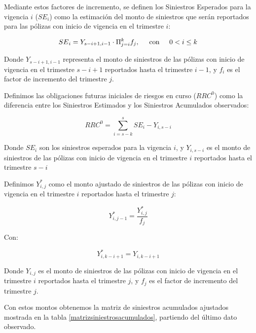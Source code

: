 \documentclass[11pt,twoside,openright,spanish]{report}
\numberwithin{equation}{chapter}
\numberwithin{figure}{chapter}
\numberwithin{table}{chapter}
\begin{document}
	Mediante estos factores de incremento, se definen los Siniestros Esperados para la vigencia $i$ (${SE}_{i}$) como la estimación del monto de siniestros que serán reportados para las pólizas con inicio de vigencia en el trimestre $i$:
	
	\begin{equation}
	{SE}_{i}={Y}_{s-i+1,i-1}\cdot\Pi_{j=i}^{k}{f}_{j},\hspace{0.5cm}\text{con}\hspace{0.5cm}0< i\le k
		\label{eq3}
	\end{equation}

	Donde ${Y}_{s-i+1,i-1}$ representa el monto de siniestros de las pólizas con inicio de vigencia en el trimestre $s-i+1$ reportados hasta el trimestre $i-1$, y ${f}_{i}$ es el factor de incremento del trimestre $j$. 

	Definimos las obligaciones futuras iniciales de riesgos en curso (${RRC}^{0}$) como la diferencia entre los Siniestros Estimados y los Siniestros Acumulados observados:
	
	\begin{equation}
	{RRC}^{0}=\sum _{i=s-k}^{s}{SE}_{i}-{Y}_{i,s-i}
	\label{eq4}
	\end{equation}

	Donde ${SE}_{i}$ son los siniestros esperados para la vigencia $i$, y ${Y}_{i,s-i}$ es el monto de siniestros de las pólizas con inicio de vigencia en el trimestre $i$ reportados hasta el trimestre $s-i$
		 
	Definimos ${Y}_{i,j}^{*}$ como el monto ajustado de siniestros de las pólizas con inicio de vigencia en el trimestre $i$ reportados hasta el trimestre $j$:
	
		\begin{equation}
	{Y}_{i,j-1}^{*}=\frac{{Y}_{i,j}^{*}}{{f}_{j}}
	\label{eq5}
	\end{equation}

	Con:

	$${Y}_{i,k-i+1}^{*}={Y}_{i,k-i+1}$$	

	Donde ${Y}_{i,j}$ es el monto de siniestros de las pólizas con inicio de vigencia en el trimestre $i$ reportados hasta el trimestre $j$, y ${f}_{j}$ es el factor de incremento del trimestre $j$.

	Con estos montos obtenemos la matriz de siniestros acumulados ajustados mostrada en la tabla \ref{matrizsiniestrosacumulados}, partiendo del último dato observado.
		
\end{document}
